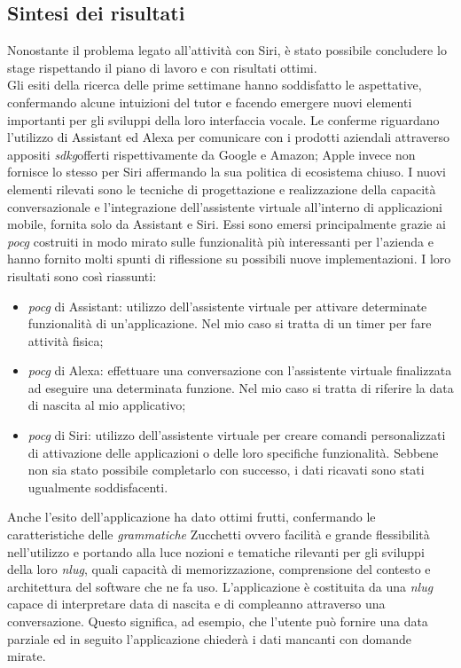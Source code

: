 \subsection{Sintesi dei risultati}
Nonostante il problema legato all'attività con Siri, è stato possibile concludere lo stage rispettando il piano di lavoro e con risultati ottimi. \\
Gli esiti della ricerca delle prime settimane hanno soddisfatto le aspettative, confermando alcune intuizioni del tutor e facendo emergere nuovi elementi importanti per gli sviluppi della loro interfaccia vocale. Le conferme riguardano l'utilizzo di Assistant ed Alexa per comunicare con i prodotti aziendali attraverso appositi \emph{\gls{sdkg}}\glsfirstoccur offerti rispettivamente da Google e Amazon; Apple invece non fornisce lo stesso per Siri affermando la sua politica di ecosistema chiuso. I nuovi elementi rilevati sono le tecniche di progettazione e realizzazione della capacità conversazionale e l'integrazione dell'assistente virtuale all'interno di applicazioni mobile, fornita solo da Assistant e Siri. Essi sono emersi principalmente grazie ai \emph{\gls{pocg}} costruiti in modo mirato sulle funzionalità più interessanti per l'azienda e hanno fornito molti spunti di riflessione su possibili nuove implementazioni. I loro risultati sono così riassunti:
\begin{itemize}
	\item \emph{\gls{pocg}} di Assistant: utilizzo dell'assistente virtuale per attivare determinate funzionalità di un'applicazione. Nel mio caso si tratta di un timer per fare attività fisica;
	\item \emph{\gls{pocg}} di Alexa: effettuare una conversazione con l'assistente virtuale finalizzata ad eseguire una determinata funzione. Nel mio caso si tratta di riferire la data di nascita al mio applicativo;
	\item \emph{\gls{pocg}} di Siri: utilizzo dell'assistente virtuale per creare comandi personalizzati di attivazione delle applicazioni o delle loro specifiche funzionalità. Sebbene non sia stato possibile completarlo con successo, i dati ricavati sono stati ugualmente soddisfacenti.
\end{itemize}
Anche l'esito dell'applicazione ha dato ottimi frutti, confermando le caratteristiche delle \emph{grammatiche} Zucchetti ovvero facilità e grande flessibilità nell'utilizzo e portando alla luce nozioni e tematiche rilevanti per gli sviluppi della loro \emph{\gls{nlug}}, quali capacità di memorizzazione, comprensione del contesto e architettura del software che ne fa uso. L'applicazione è costituita da una \emph{\gls{nlug}} capace di interpretare data di nascita e di compleanno attraverso una conversazione. Questo significa, ad esempio, che l'utente può fornire una data parziale ed in seguito l'applicazione chiederà i dati mancanti con domande mirate.
